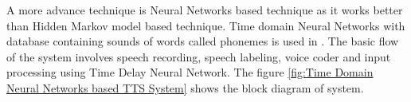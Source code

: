 

A more advance technique is Neural Networks based technique as it works better than Hidden
Markov model based technique. Time domain Neural Networks with
database containing sounds of words called phonemes is used in \cite{karaali1998text}. The basic flow of the system involves
speech recording, speech labeling, voice coder and input processing using Time Delay Neural
Network. The figure \ref{fig:Time Domain Neural Networks based TTS System} shows the block diagram of system.

